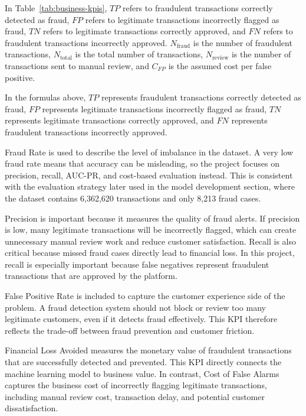 In Table~\ref{tab:business-kpis}, $TP$ refers to fraudulent transactions correctly detected as fraud, $FP$ refers to legitimate transactions incorrectly flagged as fraud, $TN$ refers to legitimate transactions correctly approved, and $FN$ refers to fraudulent transactions incorrectly approved. $N_{\text{fraud}}$ is the number of fraudulent transactions, $N_{\text{total}}$ is the total number of transactions, $N_{\text{review}}$ is the number of transactions sent to manual review, and $C_{FP}$ is the assumed cost per false positive.

In the formulas above, $TP$ represents fraudulent transactions correctly detected as fraud, $FP$ represents legitimate transactions incorrectly flagged as fraud, $TN$ represents legitimate transactions correctly approved, and $FN$ represents fraudulent transactions incorrectly approved.

Fraud Rate is used to describe the level of imbalance in the dataset. A very low fraud rate means that accuracy can be misleading, so the project focuses on precision, recall, AUC-PR, and cost-based evaluation instead. This is consistent with the evaluation strategy later used in the model development section, where the dataset contains 6,362,620 transactions and only 8,213 fraud cases.

Precision is important because it measures the quality of fraud alerts. If precision is low, many legitimate transactions will be incorrectly flagged, which can create unnecessary manual review work and reduce customer satisfaction. Recall is also critical because missed fraud cases directly lead to financial loss. In this project, recall is especially important because false negatives represent fraudulent transactions that are approved by the platform.

False Positive Rate is included to capture the customer experience side of the problem. A fraud detection system should not block or review too many legitimate customers, even if it detects fraud effectively. This KPI therefore reflects the trade-off between fraud prevention and customer friction.

Financial Loss Avoided measures the monetary value of fraudulent transactions that are successfully detected and prevented. This KPI directly connects the machine learning model to business value. In contrast, Cost of False Alarms captures the business cost of incorrectly flagging legitimate transactions, including manual review cost, transaction delay, and potential customer dissatisfaction.

